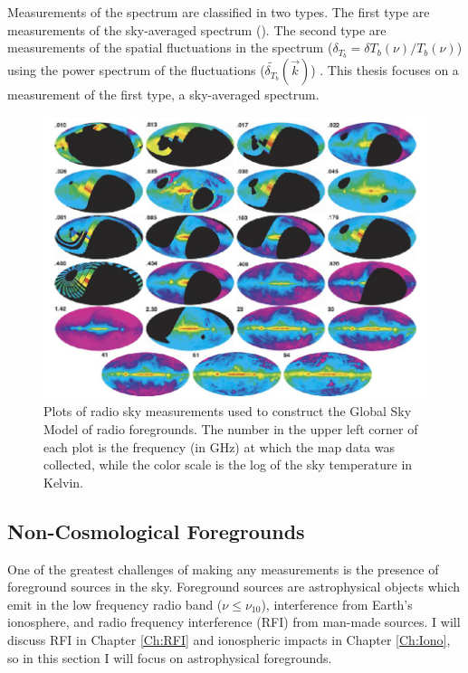 Measurements of the \cm spectrum are classified in two types. The first type are measurements of the sky-averaged spectrum (\avgdtb). The second type are measurements of the spatial fluctuations in the \cm spectrum ($\delta_{T_b} =  \delta T_b (\nu)/ T_b (\nu)$) using the power spectrum of the fluctuations ($ \tilde{ \delta_{T_b} } ( \vec{k} )$) \cite{natarajan_2014}. This thesis focuses on a measurement of the first type, a sky-averaged spectrum. 

\begin{figure}[htb]
\begin{center}
\includegraphics[width=0.95\linewidth]{Introduction/figures/GSM_maps.jpg}
\caption{Plots of radio sky measurements used to construct the Global Sky Model \cite{GSM_model} of radio foregrounds. The number in the upper left corner of each plot is the frequency (in GHz) at which the map data was collected, while the color scale is the log of the sky temperature in Kelvin.}
\label{Fig:GSM_maps}
\end{center}
\end{figure}


\subsection{Non-Cosmological Foregrounds}

One of the greatest challenges of making any \cm measurements is the presence of foreground sources in the sky. Foreground sources are astrophysical objects which emit in the low frequency radio band ($\nu \leq \nu_{10}$), interference from Earth's ionosphere, and radio frequency interference (RFI) from man-made sources. I will discuss RFI in Chapter \ref{Ch:RFI} and ionospheric impacts in Chapter \ref{Ch:Iono}, so in this section I will focus on astrophysical foregrounds. 

